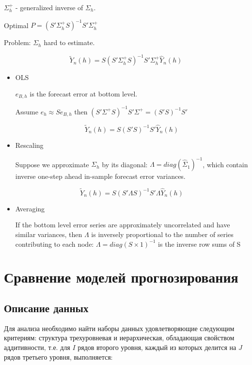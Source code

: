 \documentclass[12pt,a4paper, oneside]{extreport}
\begin{document}
$ \Sigma^{+}_h $ - generalized inverse of $ \Sigma_h $.

Optimal $ P = ( S' \Sigma^{+}_h S )^{-1}  S'  \Sigma^{+}_h  $

Problem: $ \Sigma_h $ hard to estimate.



\[ \tilde{Y}_n ( h )
= 
S ( S' \Sigma^{+}_h S )^{-1}  S'  \Sigma^{+}_h  \hat{Y}_n ( h )
\]


\begin{itemize}
	\item OLS
	
	$ e_{B , h} $ is the forecast
	error at bottom level.
	
	Assume $ e_h \approx S e_{B , h} $ 	
	then $ ( S' \Sigma^{+}  S )^{-1} S'  \Sigma^{+} = ( S'S )^{ - 1} S'  $
	
	
	\[  \tilde{Y}_n ( h )
	=  S ( S'  S )^{-1}  S'   \hat{Y}_n ( h )
	\]	
	
	
	\item Rescaling
	
	Suppose we approximate $ \Sigma_h $ by its diagonal: 
	$ \Lambda = diag(\hat{\Sigma}_1)^{-1}
	$,  which	
	contain inverse
	one-step ahead in-sample forecast error
	variances.
	
	\[ \tilde{Y}_n ( h )
	=  S ( S'  \Lambda S )^{-1}  S'   \Lambda  \hat{Y}_n ( h )
	\]
	
	\item Averaging
	
	If the bottom level error series are
	approximately uncorrelated and have similar
	variances, then $ \Lambda $ is inversely proportional to
	the number of series contributing to each
	node: 
	$ \Lambda = diag( S \times 1 )^{- 1}
	$ is  the inverse row sums of S
	
\end{itemize}



\chapter{Сравнение моделей прогнозирования}





\section{Описание данных}

Для анализа  необходимо найти наборы данных удовлетворяющие следующим критериям: 
структура трехуровневая и иерархическая, обладающая свойством аддитивности, т.е. для $I$ рядов второго уровня, каждый из которых делится на $J$ рядов третьего уровня, выполняется: 
\end{document}
